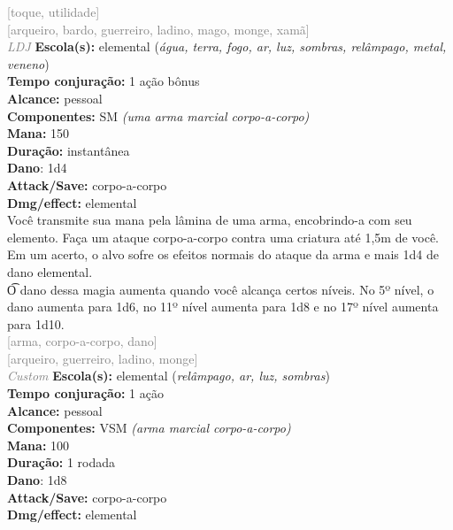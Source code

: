 \documentclass{RPG_Adventure}[2021/10/20]
\begin{document}
{\scriptsize \textcolor{gray}{[toque, utilidade]\\}}
{\scriptsize \textcolor{gray}{[arqueiro, bardo, guerreiro, ladino, mago, monge, xamã]\\}}
{\tiny \textcolor{gray}{\textit{LDJ}}}\jump{}
{\small \t \textbf{Escola(s):} elemental (\textit{água, terra, fogo, ar, luz, sombras, relâmpago, metal, veneno})\\\t \textbf{Tempo conjuração:} 1 ação bônus\\\t \textbf{Alcance:} pessoal\\\t \textbf{Componentes:} SM \textit{(uma arma marcial corpo-a-corpo)}\\\t \textbf{Mana:} 150\\\t \textbf{Duração:} instantânea\\\t \textbf{Dano}: 1d4\\\t \textbf{Attack/Save:} corpo-a-corpo\\\t \textbf{Dmg/effect:} elemental\\}
{\normalsize Você transmite sua mana pela lâmina de uma arma, encobrindo-a com seu elemento. Faça um ataque corpo-a-corpo contra uma criatura até 1,5m de você. Em um acerto, o alvo sofre os efeitos normais do ataque da arma e mais 1d4 de dano elemental.\\\t O dano dessa magia aumenta quando você alcança certos níveis. No 5º nível, o dano aumenta para 1d6, no 11º nível aumenta para 1d8 e no 17º nível aumenta para 1d10.\\}
{\scriptsize \textcolor{gray}{[arma, corpo-a-corpo, dano]\\}}
{\scriptsize \textcolor{gray}{[arqueiro, guerreiro, ladino, monge]\\}}
{\tiny \textcolor{gray}{\textit{Custom}}}\jump{}
{\small \t \textbf{Escola(s):} elemental (\textit{relâmpago, ar, luz, sombras})\\\t \textbf{Tempo conjuração:} 1 ação\\\t \textbf{Alcance:} pessoal\\\t \textbf{Componentes:} VSM \textit{(arma marcial corpo-a-corpo)}\\\t \textbf{Mana:} 100\\\t \textbf{Duração:} 1 rodada\\\t \textbf{Dano}: 1d8\\\t \textbf{Attack/Save:} corpo-a-corpo\\\t \textbf{Dmg/effect:} elemental\\}
\end{document}
